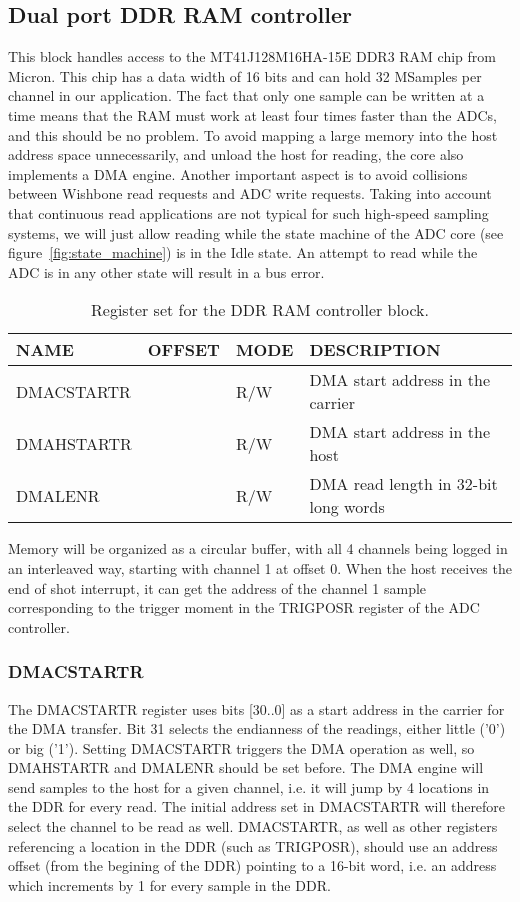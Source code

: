 \documentclass{article}
\begin{document}
\subsection{Dual port DDR RAM controller}
This block handles access to the MT41J128M16HA-15E DDR3 RAM chip from Micron. This chip has a data width of 16 bits and can hold 32 MSamples per channel in our application. The fact that only one sample can be written at a time means that the RAM must work at least four times faster than the ADCs, and this should be no problem. To avoid mapping a large memory into the host address space unnecessarily, and unload the host for reading, the core also implements a DMA engine. Another important aspect is to avoid collisions between Wishbone read requests and ADC write requests. Taking into account that continuous read applications are not typical for such high-speed sampling systems, we will just allow reading while the state machine of the ADC core (see figure~\ref{fig:state_machine}) is in the Idle state. An attempt to read while the ADC is in any other state will result in a bus error.

\begin{table}[htbp]
  \centering
  \begin{tabularx}{\textwidth}{|l|r|l|X|}
    \hline
    \textbf{NAME} & \textbf{OFFSET} & \textbf{MODE} & \textbf{DESCRIPTION} \\
    \hline
    \hline
    DMACSTARTR & & R/W & DMA start address in the carrier\\
    \hline
    DMAHSTARTR & & R/W & DMA start address in the host\\
    \hline
    DMALENR & & R/W & DMA read length in 32-bit long words\\
    \hline
  \end{tabularx}
  \caption{Register set for the DDR RAM controller block.}
  \label{tab:ddr_control}
\end{table}

Memory will be organized as a circular buffer, with all 4 channels being logged in an interleaved way, starting with channel 1 at offset 0. When the host receives the end of shot interrupt, it can get the address of the channel 1 sample corresponding to the trigger moment in the TRIGPOSR register of the ADC controller. 

\subsubsection{DMACSTARTR}
The DMACSTARTR register uses bits [30..0] as a start address in the carrier for the DMA transfer. Bit 31 selects the endianness of the readings, either little ('0') or big ('1'). Setting DMACSTARTR triggers the DMA operation as well, so DMAHSTARTR and DMALENR should be set before. The DMA engine will send samples to the host for a given channel, i.e. it will jump by 4 locations in the DDR for every read. The initial address set in DMACSTARTR will therefore select the channel to be read as well. DMACSTARTR, as well as other registers referencing a location in the DDR (such as TRIGPOSR), should use an address offset (from the begining of the DDR) pointing to a 16-bit word, i.e. an address which increments by 1 for every sample in the DDR.
\end{document}
